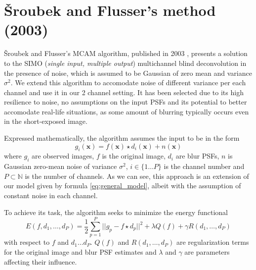 \documentclass[12pt,notitlepage]{report}
\begin{document}
\section{Šroubek and Flusser's method (2003)}
\label{sec:srou03}

Šroubek and Flusser's MCAM algorithm, published in 2003 \cite{srou03}, presents a solution to the SIMO ({\em single input, multiple output}) multichannel blind deconvolution in the presence of noise, which is assumed to be Gaussian of zero mean and variance $\sigma^2$. We extend this algorithm to accomodate noise of different variance per each channel and use it in our 2 channel setting. It has been selected due to its high resilience to noise, no assumptions on the input PSFs and its potential to better accomodate real-life situations, as some amount of blurring typically occurs even in the short-exposed image. 

Expressed mathematically, the algorithm assumes the input to be in the form
\begin{equation}
\label{eq:srou03_general_model}
	g_i(\mathbf{x}) = f(\mathbf{x}) \star d_i(\mathbf{x}) + n(\mathbf{x}) 	
\end{equation}
where $g_i$ are observed images, $f$ is the original image, $d_i$ are blur PSFs, $n$ is Gaussian zero-mean noise of variance $\sigma^2$, $i \in \{1 \dots P\}$ is the channel number and $P \subset \mathbb{N}$ is the number of channels. As we can see, this approach is an extension of our model given by formula \ref{eq:general_model}, albeit with the assumption of constant noise in each channel. 

To achieve its task, the algorithm seeks to minimize the energy functional 
\begin{equation}
\label{eq:srou03_energy}
	E(f, d_1, \dots, d_P) = \frac{1}{2} \sum_{p=1}^{P} || g_p - f \star d_p ||^2 + \lambda Q(f) + \gamma R(d_1, \dots , d_P)	
\end{equation}
with respect to $f$ and $d_1 \dots d_P$. $Q(f)$ and $R(d_1, \dots, d_P)$ are regularization terms for the original image and blur PSF estimates and $\lambda$ and $\gamma$ are parameters affecting their influence. 
\end{document}
